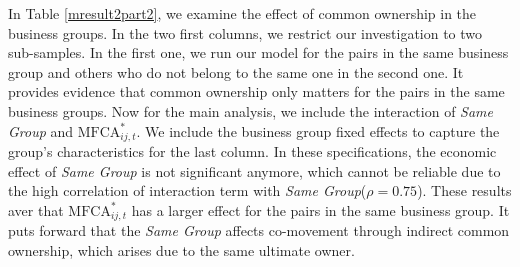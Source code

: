 	In Table  \ref{mresult2part2}, we examine the effect of common ownership in the business groups. In the two first columns, we restrict our investigation to two sub-samples. In the first one, we run our model for the pairs in the same business group and others who do not belong to the same one in the second one. It provides evidence that common ownership only matters for the pairs in the same business groups.	
	Now for the main analysis, we include the interaction of \textit{Same Group} and $\text{MFCA}^*_{ij,t}$. We include the business group fixed effects to capture the group's characteristics for the last column. In these specifications, the economic effect of \textit{Same Group} is not significant anymore, which cannot be reliable due to the high correlation of interaction term with \textit{Same Group}($\rho = 0.75$). These results aver that $\text{MFCA}^*_{ij,t}$ has a larger effect for the pairs in the same business group. It puts forward that the \textit{Same Group}  affects co-movement through indirect common ownership, which arises due to the same ultimate owner. 
	
	
	


